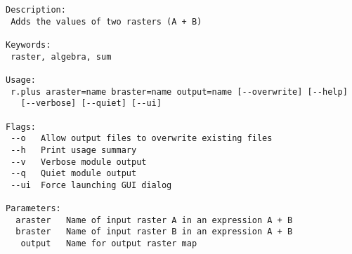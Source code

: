 \documentclass{standalone}
\begin{document}
\begin{lstlisting}[linewidth=34.2em]
Description:
 Adds the values of two rasters (A + B)

Keywords:
 raster, algebra, sum

Usage:
 r.plus araster=name braster=name output=name [--overwrite] [--help]
   [--verbose] [--quiet] [--ui]

Flags:
 --o   Allow output files to overwrite existing files
 --h   Print usage summary
 --v   Verbose module output
 --q   Quiet module output
 --ui  Force launching GUI dialog

Parameters:
  araster   Name of input raster A in an expression A + B
  braster   Name of input raster B in an expression A + B
   output   Name for output raster map
\end{lstlisting}
\end{document}

